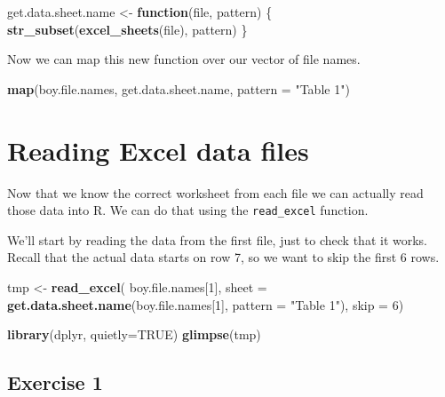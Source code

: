 \documentclass[]{book}
\newenvironment{Shaded}{\begin{snugshade}}{\end{snugshade}}
\newcommand{\KeywordTok}[1]{\textcolor[rgb]{0.13,0.29,0.53}{\textbf{#1}}}
\newcommand{\DataTypeTok}[1]{\textcolor[rgb]{0.13,0.29,0.53}{#1}}
\newcommand{\DecValTok}[1]{\textcolor[rgb]{0.00,0.00,0.81}{#1}}
\newcommand{\StringTok}[1]{\textcolor[rgb]{0.31,0.60,0.02}{#1}}
\newcommand{\OtherTok}[1]{\textcolor[rgb]{0.56,0.35,0.01}{#1}}
\newcommand{\ControlFlowTok}[1]{\textcolor[rgb]{0.13,0.29,0.53}{\textbf{#1}}}
\newcommand{\NormalTok}[1]{#1}
\begin{document}
\begin{Shaded}
\begin{Highlighting}[]
\NormalTok{get.data.sheet.name <-}\StringTok{ }\ControlFlowTok{function}\NormalTok{(file, pattern) \{}
    \KeywordTok{str_subset}\NormalTok{(}\KeywordTok{excel_sheets}\NormalTok{(file), pattern)}
\NormalTok{\}}
\end{Highlighting}
\end{Shaded}

Now we can map this new function over our vector of file names.

\begin{Shaded}
\begin{Highlighting}[]
\KeywordTok{map}\NormalTok{(boy.file.names,}
\NormalTok{    get.data.sheet.name,}
    \DataTypeTok{pattern =} \StringTok{"Table 1"}\NormalTok{)}
\end{Highlighting}
\end{Shaded}

\section{Reading Excel data files}\label{reading-excel-data-files}

Now that we know the correct worksheet from each file we can actually
read those data into R. We can do that using the \texttt{read\_excel}
function.

We'll start by reading the data from the first file, just to check that
it works. Recall that the actual data starts on row 7, so we want to
skip the first 6 rows.

\begin{Shaded}
\begin{Highlighting}[]
\NormalTok{tmp <-}\StringTok{ }\KeywordTok{read_excel}\NormalTok{(}
\NormalTok{    boy.file.names[}\DecValTok{1}\NormalTok{],}
    \DataTypeTok{sheet =} \KeywordTok{get.data.sheet.name}\NormalTok{(boy.file.names[}\DecValTok{1}\NormalTok{],}
                                \DataTypeTok{pattern =} \StringTok{"Table 1"}\NormalTok{),}
    \DataTypeTok{skip =} \DecValTok{6}\NormalTok{)}

\KeywordTok{library}\NormalTok{(dplyr, }\DataTypeTok{quietly=}\OtherTok{TRUE}\NormalTok{)}
\KeywordTok{glimpse}\NormalTok{(tmp)}
\end{Highlighting}
\end{Shaded}

\subsection{Exercise 1}\label{exercise-1}
\end{document}
